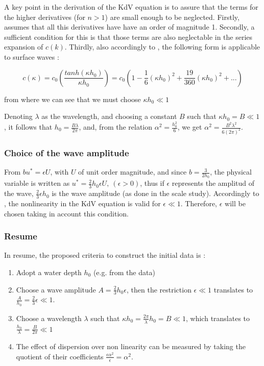 \indent A key point in the derivation of the KdV equation is to assure that the terms for the higher derivatives (for $n > 1$) are small enough to be neglected. Firstly, \cite{BBM1971} assumes that all this derivatives have have an order of magnitude 1. Secondly, a sufficient condition for this is that those terms are also neglectable in the series expansion of $c(k)$. Thirdly, also accordingly to \cite{BBM1971}, the following form is applicable to surface waves : 

$$c(\kappa) = c_0 \left(\frac{tanh(\kappa h_0)}{\kappa h_0}\right) = c_0 \left(1 - \frac{1}{6}(\kappa h_0)^2 + \frac{19}{360}(\kappa h_0)^2 + ... \right) $$

\noindent from where we can see that we must choose $\kappa h_0 \ll 1$

\indent Denoting $\lambda$ as the wavelength, and choosing a constant $B$ such that $\kappa h_0  =  B \ll 1$, it follows that $h_0 = \frac{B\lambda}{2\pi}$, and, from the relation $\alpha^2 = \frac{h_0^2}{6}$, we get $\alpha^2 = \frac{B^2\lambda^2}{6(2\pi)^2}$.

\subsubsection{Choice of the wave amplitude}

\indent From $bu^* = \epsilon U$, with $U$ of unit order magnitude, and since $b = \frac{3}{2h_0}$, the physical variable is written as $u^* = \frac{2}{3}h_0\epsilon U, \ (\epsilon > 0)$, thus if $\epsilon$ represents the amplitud of the wave, $\frac{2}{3}\epsilon h_0$ is the wave amplitude (as done in the scale study). Accordingly to \cite{BBM1971}, the nonlinearity in the KdV equation is valid for $\epsilon \ll 1$. Therefore, $\epsilon$ will be chosen taking in account this condition.

\subsubsection{Resume}

\indent In resume, the proposed criteria to construct the initial data is : 

\begin{enumerate}
\item Adopt a water depth $h_0$ (e.g. from the data)
\item Choose a wave amplitude  $A = \frac{2}{3}h_0\epsilon$, then the restriction $\epsilon \ll 1$ translates to $\frac{A}{h_0} = \frac{2}{3}\epsilon \ll 1$.
\item Choose a wavelength $\lambda$ such that $\kappa h_0 = \frac{2\pi}{\lambda}h_0 = B \ll 1$, which translates to $\frac{h_0}{\lambda} = \frac{B}{2\pi} \ll 1$
\item The effect of dispersion over non linearity can be measured by taking the quotient of their coefficients $\frac{\epsilon \alpha^2}{\epsilon} = \alpha^2$.
\end{enumerate}

